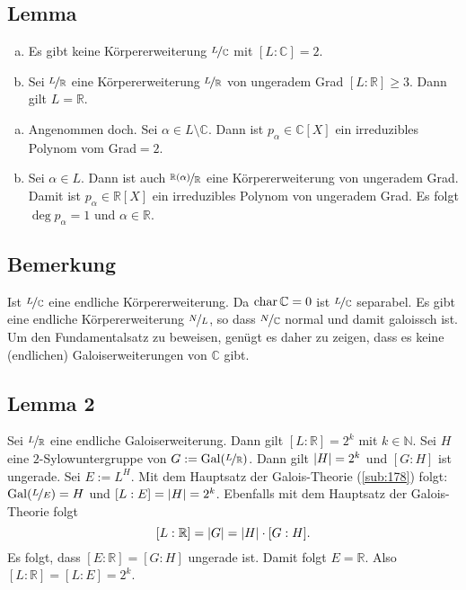 \subsection[Lemma: Grundlegende Eigenschaften des Grades von KE  $\nicefrac{L}{\mathds{C}}$ und $\nicefrac{L}{\mathds{R}}$]{Lemma} %
\label{sub:186}
\begin{enumerate}[a)]
	\item Es gibt keine Körpererweiterung $\nicefrac{L}{\mathds{C}}$ mit $[L : \mathds{C}] =2$.
	\item Sei $\nicefrac{L}{\mathds{R}}$ eine Körpererweiterung $\nicefrac{L}{\mathds{R}}$ von ungeradem Grad $[L:\mathds{R}]\ge 3$. Dann gilt $L=\mathds{R}$.
\end{enumerate}
\begin{enumerate}[a)]
	\item Angenommen doch. Sei $\alpha \in L \setminus \mathds{C}$. Dann ist $p_\alpha \in \mathds{C}[X]$ ein irreduzibles Polynom vom Grad$=2$. \light
	\item Sei $\alpha \in L$. Dann ist auch $\nicefrac{\mathds{R}(\alpha)}{\mathds{R}}$ eine Körpererweiterung von ungeradem Grad. Damit ist $p_\alpha \in \mathds{R}[X]$ ein
	irreduzibles Polynom von ungeradem Grad. Es folgt $\deg p_\alpha =1$ und $\alpha \in \mathds{R}$. \bewende
\end{enumerate}

\subsection[Bemerkung zur Beweisstrategie]{Bemerkung} %
\label{sub:187}
Ist $\nicefrac{L}{\mathds{C}}$ eine endliche Körpererweiterung. Da $\Char \mathds{C} =0$ ist $\nicefrac{L}{\mathds{C}}$ separabel. Es gibt  eine endliche Körpererweiterung $\nicefrac{N}{L}$, so dass $\nicefrac{N}{\mathds{C}}$ normal und damit galoissch ist. Um den Fundamentalsatz zu 
beweisen, genügt es daher zu zeigen, dass es keine (endlichen) Galoiserweiterungen von $\mathds{C}$ gibt.

\subsection[Lemma 2: Endliche KE von $\mathds{R}$ haben Grad $2^k$]{Lemma 2} %
\label{sub:188}
Sei $\nicefrac{L}{\mathds{R}}$ eine endliche Galoiserweiterung. Dann gilt $[L:\mathds{R}]= 2^k$ mit $k \in \mathds{N}$.
Sei $H$ eine $2$-Sylowuntergruppe von $G := \Gal(\nicefrac{L}{\mathds{R}})$. Dann gilt $\abs*{H}= 2^k $ und $[G:H]$ ist ungerade. Sei $E := L^H$. Mit dem Hauptsatz der 
Galois-Theorie (\ref{sub:178}) folgt: $\Gal(\nicefrac{L}{E}) =H$ und $[L:E]= \abs*{H} = 2^k $. Ebenfalls mit dem Hauptsatz der Galois-Theorie folgt
\[
	[L:\mathds{R}] = \abs*{G} = \abs*{H} \cdot [G:H].  
\]
Es folgt, dass $[E:\mathds{R}] = [G :H]$ ungerade ist. Damit folgt $E=\mathds{R}$. Also $[L:\mathds{R}] = [L:E] = 2^k$. \bewende

